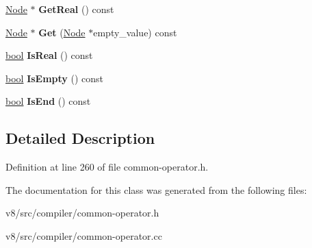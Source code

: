 \begin{DoxyCompactItemize}
\mbox{\hyperlink{classv8_1_1internal_1_1compiler_1_1Node}{Node}} $\ast$ {\bfseries Get\+Real} () const
\item 
\mbox{\label{classv8_1_1internal_1_1compiler_1_1SparseInputMask_1_1InputIterator_aac5214160e478ebfc65d850566206c62}} 
\mbox{\hyperlink{classv8_1_1internal_1_1compiler_1_1Node}{Node}} $\ast$ {\bfseries Get} (\mbox{\hyperlink{classv8_1_1internal_1_1compiler_1_1Node}{Node}} $\ast$empty\+\_\+value) const
\item 
\mbox{\label{classv8_1_1internal_1_1compiler_1_1SparseInputMask_1_1InputIterator_a1810ebea670f9b4174fe9a3c0cf19a51}} 
\mbox{\hyperlink{classbool}{bool}} {\bfseries Is\+Real} () const
\item 
\mbox{\label{classv8_1_1internal_1_1compiler_1_1SparseInputMask_1_1InputIterator_a66a1283cc787964300a19e02f3d81ecb}} 
\mbox{\hyperlink{classbool}{bool}} {\bfseries Is\+Empty} () const
\item 
\mbox{\label{classv8_1_1internal_1_1compiler_1_1SparseInputMask_1_1InputIterator_a77b3b66b5528cae10df6d9e5e2f428d8}} 
\mbox{\hyperlink{classbool}{bool}} {\bfseries Is\+End} () const
\end{DoxyCompactItemize}


\subsection{Detailed Description}


Definition at line 260 of file common-\/operator.\+h.



The documentation for this class was generated from the following files\+:\begin{DoxyCompactItemize}
\item 
v8/src/compiler/common-\/operator.\+h\item 
v8/src/compiler/common-\/operator.\+cc\end{DoxyCompactItemize}
